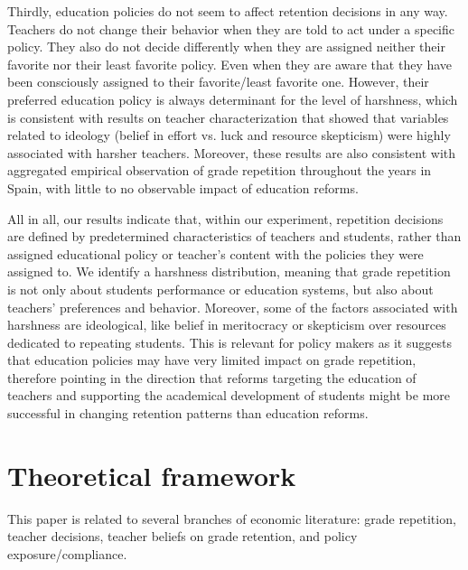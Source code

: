 \documentclass[12pt,a4paper]{article}
\begin{document}
Thirdly, education policies do not seem to affect retention decisions in any way. Teachers do not change their behavior when they are told to act under a specific policy. They also do not decide differently when they are assigned neither their favorite nor their least favorite policy. Even when they are aware that they have been consciously assigned to their favorite/least favorite one. However, their preferred education policy is always determinant for the level of harshness, which is consistent with results on teacher characterization that showed that variables related to ideology (belief in effort vs. luck and resource skepticism) were highly associated with harsher teachers. Moreover, these results are also consistent with aggregated empirical observation of grade repetition throughout the years in Spain, with little to no observable impact of education reforms.

All in all, our results indicate that, within our experiment, repetition decisions are defined by predetermined characteristics of teachers and students, rather than assigned educational policy or teacher's content with the policies they were assigned to. We identify a harshness distribution, meaning that grade repetition is not only about students performance or education systems, but also about teachers' preferences and behavior. Moreover, some of the factors associated with harshness are ideological, like belief in meritocracy or skepticism over resources dedicated to repeating students. This is relevant for policy makers as it suggests that education policies may have very limited impact on grade repetition, therefore pointing in the direction that reforms targeting the education of teachers and supporting the academical development of students might be more successful in changing retention patterns than education reforms. 


\section{Theoretical framework}

This paper is related to several branches of economic literature: grade repetition, teacher decisions, teacher beliefs on grade retention, and policy exposure/compliance. 
\end{document}
